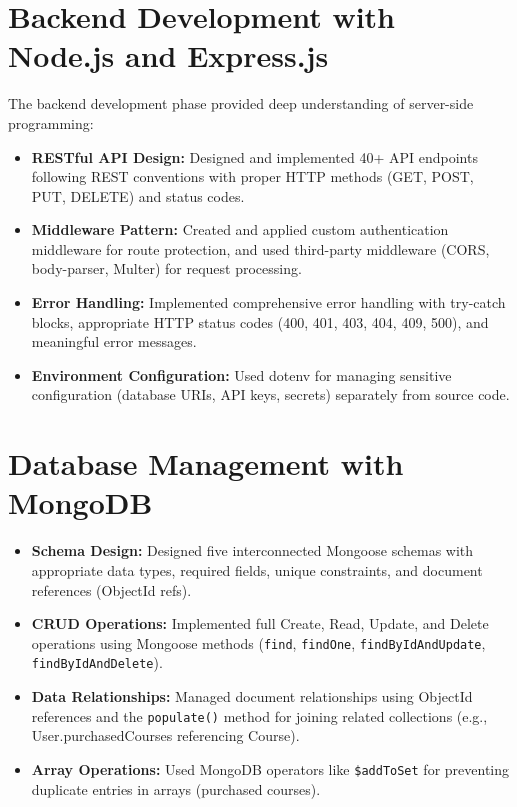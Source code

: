 \documentclass[12pt,a4paper]{report}
\begin{document}
\section{Backend Development with Node.js and Express.js}
The backend development phase provided deep understanding of server-side programming:
\begin{itemize}
    \item \textbf{RESTful API Design:} Designed and implemented 40+ API endpoints following REST conventions with proper HTTP methods (GET, POST, PUT, DELETE) and status codes.
    \item \textbf{Middleware Pattern:} Created and applied custom authentication middleware for route protection, and used third-party middleware (CORS, body-parser, Multer) for request processing.
    \item \textbf{Error Handling:} Implemented comprehensive error handling with try-catch blocks, appropriate HTTP status codes (400, 401, 403, 404, 409, 500), and meaningful error messages.
    \item \textbf{Environment Configuration:} Used dotenv for managing sensitive configuration (database URIs, API keys, secrets) separately from source code.
\end{itemize}

\section{Database Management with MongoDB}
\begin{itemize}
    \item \textbf{Schema Design:} Designed five interconnected Mongoose schemas with appropriate data types, required fields, unique constraints, and document references (ObjectId refs).
    \item \textbf{CRUD Operations:} Implemented full Create, Read, Update, and Delete operations using Mongoose methods (\texttt{find}, \texttt{findOne}, \texttt{findByIdAndUpdate}, \texttt{findByIdAndDelete}).
    \item \textbf{Data Relationships:} Managed document relationships using ObjectId references and the \texttt{populate()} method for joining related collections (e.g., User.purchasedCourses referencing Course).
    \item \textbf{Array Operations:} Used MongoDB operators like \texttt{\$addToSet} for preventing duplicate entries in arrays (purchased courses).
\end{itemize}
\end{document}
